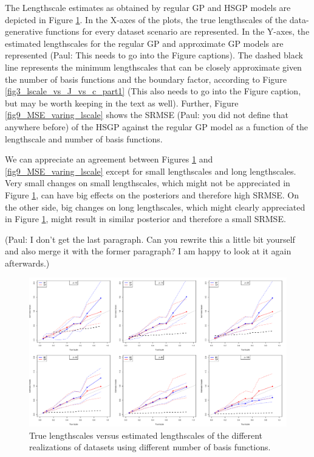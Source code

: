 \documentclass[]{interact}
\theoremstyle{plain}%
\theoremstyle{definition}
\theoremstyle{remark}
\begin{document}
The Lengthscale estimates as obtained by regular GP and HSGP models are depicted in Figure \ref{fig8_Tlscale_vs_Elscale}. In the X-axes of the plots, the true lengthscales of the data-generative functions for every dataset scenario are represented. In the Y-axes, the estimated lengthscales for the regular GP and approximate GP models are represented (Paul: This needs to go into the Figure captions). The dashed black line represents the minimum lengthscales that can be closely approximate given the number of basis functions and the boundary factor, according to Figure \ref{fig3_lscale_vs_J_vs_c_part1} (This also needs to go into the Figure caption, but may be worth keeping in the text as well). Further, Figure \ref{fig9_MSE_varing_lscale} shows the SRMSE (Paul: you did not define that anywhere before) of the HSGP against the regular GP model as a function of the lengthscale and number of basis functions.

We can appreciate an agreement between Figures \ref{fig8_Tlscale_vs_Elscale} and \ref{fig9_MSE_varing_lscale} except for small lengthscales and long lengthscales. Very small changes on small lengthscales, which might not be appreciated in Figure \ref{fig8_Tlscale_vs_Elscale}, can have big effects on the posteriors and therefore high SRMSE. On the other side, big changes on long lengthscales, which might clearly appreciated in Figure \ref{fig8_Tlscale_vs_Elscale}, might result in similar posterior and therefore a small SRMSE. 

(Paul: I don't get the last paragraph. Can you rewrite this a little bit yourself and also merge it with the former paragraph? I am happy to look at it again afterwards.)


\begin{figure}
\centering
\includegraphics[width=\textwidth]{fig8_Tlscale_vs_Elscale.pdf}
\caption{True lengthscales versus estimated lengthscales of the different realizations of datasets using different number of basis functions. }
  \label{fig8_Tlscale_vs_Elscale}
\end{figure}
\end{document}
